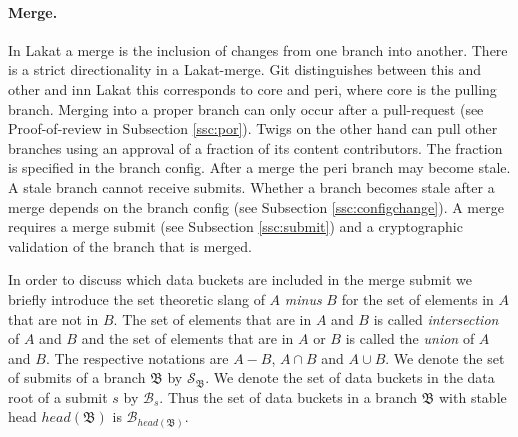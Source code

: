 \documentclass[14pt]{article}
\begin{document}
\paragraph{Merge.} In Lakat a merge is the inclusion of changes from one branch into another. There is a strict directionality in a Lakat-merge. Git distinguishes between this and other and inn Lakat this corresponds to core and peri, where core is the pulling branch. Merging into a proper branch can only occur after a pull-request (see Proof-of-review in Subsection \ref{ssc:por}). Twigs on the other hand can pull other branches using an approval of a fraction of its content contributors. The fraction is specified in the branch config. After a merge the peri branch may become stale. A stale branch cannot receive submits. Whether a branch becomes stale after a merge depends on the branch config (see Subsection \ref{ssc:configchange}).
A merge requires a merge submit (see Subsection \ref{ssc:submit}) and a cryptographic validation of the branch that is merged.

In order to discuss which data buckets are included in the merge submit we briefly introduce the set theoretic slang of $A$ \textit{minus} $B$ for the set of elements in $A$ that are not in $B$. The set of elements that are in $A$ and $B$ is called \textit{intersection} of $A$ and $B$ and the set of elements that are in $A$ or $B$ is called the \textit{union} of $A$ and $B$. The respective notations are $A-B$, $A\cap B$ and $A\cup B$. We denote the set of submits of a branch $\mathfrak B$ by $\mathcal S_{\mathfrak B}$. We denote the set of data buckets in the data root of a submit $s$ by $\mathcal{B}_s$. Thus the set of data buckets in a branch $\mathfrak B$ with stable head $head(\mathfrak B)$ is $\mathcal{B}_{head(\mathfrak B)}$. 
\end{document}
